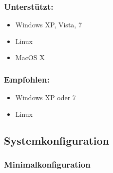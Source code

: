 \documentclass[11pt,a4paper,twoside,ngerman]{article}
\begin{document}
\subsubsection*{Unterstützt:}

\begin{itemize}

\item Windows XP, Vista, 7


\item Linux


\item MacOS X


\end{itemize}

\subsubsection*{Empfohlen:}

\begin{itemize}

\item Windows XP oder 7


\item Linux


\end{itemize}

\subsection*{Systemkonfiguration}

\subsubsection*{Minimalkonfiguration}
\end{document}
